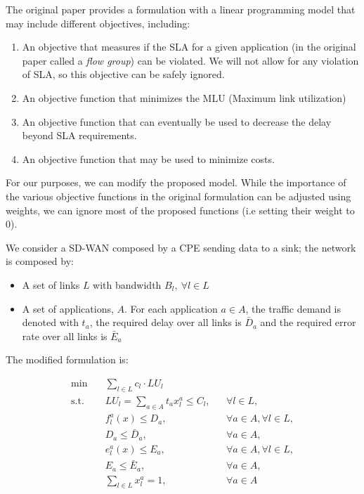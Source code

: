 	The original paper provides a formulation with a linear programming model that may include different objectives, including:
	
	\begin{enumerate}
		\item An objective that measures if the SLA for a given application (in the original paper called a \textit{flow group}) can be violated. We will not allow for any violation of SLA, so this objective can be safely ignored.
		\item An objective function that minimizes the MLU (Maximum link utilization)
		\item An objective function that can eventually be used to decrease the delay beyond SLA requirements.
		\item An objective function that may be used to minimize costs.
	\end{enumerate}
	
	For our purposes, we can  modify the proposed model. While the importance of the various objective functions in the original formulation can be adjusted using weights, we can ignore most of the proposed functions (i.e setting their weight to 0).
	
	We consider a SD-WAN composed by a CPE sending data to a sink; the network is composed by:
	\begin{itemize}
		\item A set of links $L$ with bandwidth $B_l, \ \forall l \in L$
		\item A set of applications, $A$. For each application $a \in A$, the traffic demand is denoted with $t_a$, the required delay over all links is $\bar{D}_a$ and the required error rate over all links is $\bar{E}_a$
	\end{itemize}
	
	The modified formulation is:
	\begin{center}
		\begin{align}
			\min & \quad \sum_{l \in L} c_l \cdot LU_l  \tag{1}
			\label{eq:objective}
			\\
			\text{s.t.} 
			& \quad LU_l = \sum_{a \in A} t_a x^a_l \leq C_l, 
			&& \forall l \in L, \tag{2} \label{eq:2} \\			
			& \quad f^a_l(x) \leq D_a, 
			&& \forall a \in A, \forall l \in L, \tag{3} \label{eq:3} \\	
			& \quad D_a \leq \bar{D}_a, 
			&& \forall a \in A, \tag{4} \label{eq:4} \\	
			& \quad e^a_l(x) \leq E_a, 
			&& \forall a \in A, \forall l \in L, \tag{5}  \label{eq:5} \\	
			& \quad E_a \leq \bar{E}_a, 
			&& \forall a \in A, \tag{6}  \label{eq:6} \\	
			& \quad \sum_{l \in L} x^a_l = 1, 
			&& \forall a \in A \tag{7}  \label{eq:7}
		\end{align}
	\end{center}
	
